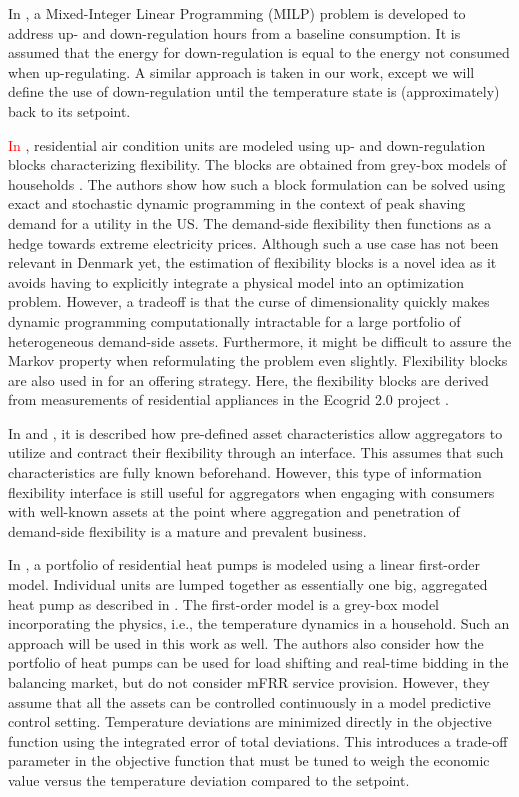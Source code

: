 \documentclass[11pt,a4paper]{article}
\begin{document}
In \cite{de2019leveraging}, a Mixed-Integer Linear Programming (MILP) problem  is developed to  address up- and down-regulation hours from a baseline consumption. It is assumed that the energy for down-regulation is equal to the energy not consumed when up-regulating. A similar approach is taken in our work, except we will define the use of down-regulation until the temperature state is (approximately) back to its setpoint.

\textcolor{red}{In \cite{schaperow2019simulation,chanpiwat2020using, moglen2020optimal}}, residential air condition units are modeled using up- and down-regulation blocks characterizing flexibility. The blocks are obtained from grey-box models of households \cite{siemann2013performance}. The authors show how such a block formulation can be solved using exact and stochastic dynamic programming in the context of peak shaving demand for a utility in the US. The demand-side flexibility then functions as a hedge towards extreme electricity prices. Although such a use case has not been relevant in Denmark yet, the estimation of flexibility blocks is a novel idea as it avoids having to explicitly integrate a physical model into an optimization problem. However, a tradeoff is that the curse of dimensionality quickly makes dynamic programming computationally intractable for a large portfolio of heterogeneous demand-side assets. Furthermore, it might be difficult to assure the Markov property \cite{MarkovProperty} when reformulating the problem even slightly. Flexibility blocks are also used in \cite{bobo2018offering} for an offering strategy. Here, the flexibility blocks are derived from measurements of residential appliances in the Ecogrid 2.0 project \cite{ecogrid}.

In \cite{biegel2013information} and \cite{BiegelConstractingFlexServices}, it is described how pre-defined asset characteristics allow aggregators to utilize and contract their flexibility through an interface. This assumes that such characteristics are fully known beforehand. However, this type of information flexibility interface is still useful for aggregators when engaging with consumers with well-known assets at the point where aggregation and penetration of demand-side flexibility is a mature and prevalent business.

In \cite{biegel2013electricity}, a portfolio of residential heat pumps is modeled using a linear first-order model. Individual units are lumped together as essentially one big, aggregated heat pump as described in \cite{biegel2013lumped}. The first-order model is a grey-box model incorporating the physics, i.e., the temperature dynamics in a household. Such an approach will be used in this work as well. The authors also consider how the portfolio of heat pumps can be used for load shifting and real-time bidding in the balancing market, but do not consider mFRR service provision. However, they assume that all the assets can be controlled continuously in a  model predictive control  setting. Temperature deviations are minimized directly in the objective function using the integrated error of total deviations. This introduces a trade-off parameter in the objective function that must be tuned to weigh the economic value versus the temperature deviation compared to the setpoint.
\end{document}
